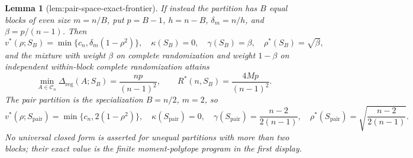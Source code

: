 \documentclass{article}
\newtheorem{lemma}{Lemma}
\begin{document}
\begin{lemma}[lem:pair-space-exact-frontier]
If instead the partition has \(B\) equal blocks of even size \(m=n/B\), put \(p=B-1\), \(h=n-B\), \(\delta_m=n/h\), and \(\beta=p/(n-1)\).  Then
\[
v^*(\rho;S_B)=\min\{c_n,\delta_m(1-\rho^2)\},
\quad
\kappa(S_B)=0,
\quad
\gamma(S_B)=\beta,
\quad
\rho^*(S_B)=\sqrt\beta,
\]
and the mixture with weight \(\beta\) on complete randomization and weight \(1-\beta\) on independent within-block complete randomization attains
\[
\min_{A\in\mathcal C_n}\Delta_{\mathrm{reg}}(A;S_B)
=\frac{np}{(n-1)^2},
\qquad
R^*(n,S_B)=\frac{4Mp}{(n-1)^2}.
\]
The pair partition is the specialization \(B=n/2\), \(m=2\), so
\[
v^*(\rho;S_{\mathrm{pair}})=\min\{c_n,2(1-\rho^2)\},
\quad
\kappa(S_{\mathrm{pair}})=0,
\quad
\gamma(S_{\mathrm{pair}})=\frac{n-2}{2(n-1)},
\quad
\rho^*(S_{\mathrm{pair}})=\sqrt{\frac{n-2}{2(n-1)}}.
\]
No universal closed form is asserted for unequal partitions with more than two blocks; their exact value is the finite moment-polytope program in the first display.
\end{lemma}
\end{document}
